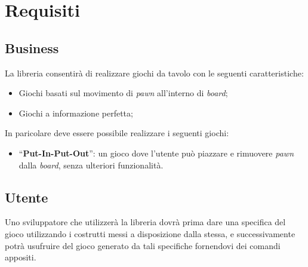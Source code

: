 \section{Requisiti}




\subsection{Business}

La libreria consentirà di realizzare giochi da tavolo con le seguenti caratteristiche:

\begin{itemize}
    \item Giochi basati sul movimento di \textit{pawn} all'interno di \textit{board};
    \item Giochi a informazione perfetta; %
\end{itemize}

In paricolare deve essere possibile realizzare i seguenti giochi:

\begin{itemize}
    \item ``\textbf{Put-In-Put-Out}'': un gioco dove l'utente può piazzare e rimuovere \textit{pawn} dalla \textit{board}, senza ulteriori funzionalità.
\end{itemize}

\subsection{Utente}

Uno sviluppatore che utilizzerà la libreria dovrà prima dare una specifica del gioco utilizzando i costrutti messi a disposizione dalla stessa, e successivamente potrà usufruire del gioco generato da tali specifiche fornendovi dei comandi appositi.

